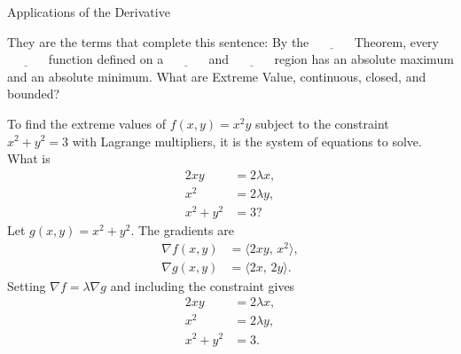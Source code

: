 \documentclass{article}
\begin{document}
\begin{category}{Applications of the Derivative}
  \begin{clue}
    They are the terms that complete this sentence: By the $\underline{\hspace{3em}}$ Theorem, every $\underline{\hspace{3em}}$ function defined on a $\underline{\hspace{3em}}$ and $\underline{\hspace{3em}}$ region has an absolute maximum and an absolute minimum.
  \response
    What are Extreme Value, continuous, closed, and bounded?
  \end{clue}

  \begin{clue}[write]
    To find the extreme values of $f(x,y)=x^2y$ subject to the constraint $x^2+y^2=3$ with Lagrange multipliers, it is the system of equations to solve.
  \response
    What is
    \begin{align*}
    2xy&=2\lambda x, \\
    x^2&=2\lambda y, \\
    x^2+y^2&=3?
    \end{align*}
  \solution
    Let $g(x,y)=x^2+y^2.$ The gradients are
    \begin{align*}
    \nabla f(x,y)&=\langle 2xy,\,x^2\rangle, \\
    \nabla g(x,y)&=\langle 2x,\,2y\rangle.
    \end{align*}
    Setting $\nabla f=\lambda\nabla g$ and including the constraint gives
    \begin{align*}
    2xy&=2\lambda x, \\
    x^2&=2\lambda y, \\
    x^2+y^2&=3.
    \end{align*}
  \end{clue}

\end{category}
\end{document}
